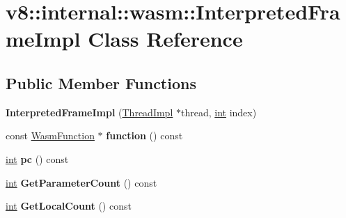 \hypertarget{classv8_1_1internal_1_1wasm_1_1InterpretedFrameImpl}{}\section{v8\+:\+:internal\+:\+:wasm\+:\+:Interpreted\+Frame\+Impl Class Reference}
\label{classv8_1_1internal_1_1wasm_1_1InterpretedFrameImpl}
\subsection*{Public Member Functions}
\begin{DoxyCompactItemize}
\item 
\mbox{\label{classv8_1_1internal_1_1wasm_1_1InterpretedFrameImpl_a3ce126867a95520380cd78386c58ba5c}} 
{\bfseries Interpreted\+Frame\+Impl} (\mbox{\hyperlink{classv8_1_1internal_1_1wasm_1_1ThreadImpl}{Thread\+Impl}} $\ast$thread, \mbox{\hyperlink{classint}{int}} index)
\item 
\mbox{\label{classv8_1_1internal_1_1wasm_1_1InterpretedFrameImpl_a2438d3642b426fda95197b33e579762f}} 
const \mbox{\hyperlink{structv8_1_1internal_1_1wasm_1_1WasmFunction}{Wasm\+Function}} $\ast$ {\bfseries function} () const
\item 
\mbox{\label{classv8_1_1internal_1_1wasm_1_1InterpretedFrameImpl_a88c147a3ac64ad44b944437b15261762}} 
\mbox{\hyperlink{classint}{int}} {\bfseries pc} () const
\item 
\mbox{\label{classv8_1_1internal_1_1wasm_1_1InterpretedFrameImpl_a4435cdd6c08c0b93a52540c3103be144}} 
\mbox{\hyperlink{classint}{int}} {\bfseries Get\+Parameter\+Count} () const
\item 
\mbox{\label{classv8_1_1internal_1_1wasm_1_1InterpretedFrameImpl_a7c085f4900c23a382914a586cb4d1ea9}} 
\mbox{\hyperlink{classint}{int}} {\bfseries Get\+Local\+Count} () const
\item 
\mbox{\label{classv8_1_1internal_1_1wasm_1_1InterpretedFrameImpl_ae51c0b4f8a831472611ef3689b000ca4}} 

\end{DoxyCompactItemize}

